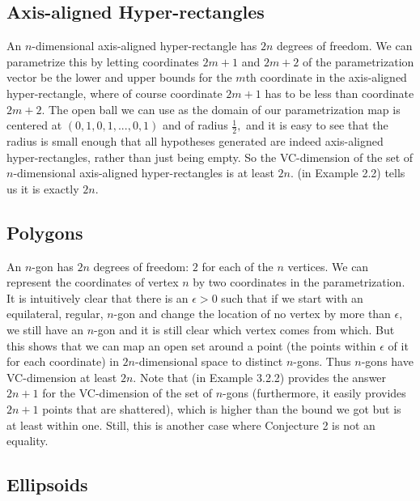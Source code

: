 \documentclass[12pt]{amsart}
\newcommand{\0}{\mat{0}}
\newcommand{\1}{\mathds{1}}
\begin{document}
\subsection{Axis-aligned Hyper-rectangles}

An $n$-dimensional axis-aligned hyper-rectangle has $2n$ degrees of freedom. We can parametrize this by letting coordinates $2m + 1$ and $2m + 2$ of the parametrization vector be the lower and upper bounds for the $m$th coordinate in the axis-aligned hyper-rectangle, where of course coordinate $2m + 1$ has to be less than coordinate $2m + 2.$ The open ball we can use as the domain of our parametrization map is centered at $(0, 1, 0, 1, ..., 0, 1)$ and of radius $\frac{1}{2},$ and it is easy to see that the radius is small enough that all hypotheses generated are indeed axis-aligned hyper-rectangles, rather than just being empty. So the VC-dimension of the set of $n$-dimensional axis-aligned hyper-rectangles is at least $2n.$ \citep{rectangles-ngons} (in Example 2.2) tells us it is exactly $2n.$

\subsection{Polygons}

An $n$-gon has $2n$ degrees of freedom: $2$ for each of the $n$ vertices. We can represent the coordinates of vertex $n$ by two coordinates in the parametrization. It is intuitively clear that there is an $\epsilon > 0$ such that if we start with an equilateral, regular, $n$-gon and change the location of no vertex by more than $\epsilon,$ we still have an $n$-gon and it is still clear which vertex comes from which. But this shows that we can map an open set around a point (the points within $\epsilon$ of it for each coordinate) in $2n$-dimensional space to distinct $n$-gons. Thus $n$-gons have VC-dimension at least $2n.$ Note that \citep{rectangles-ngons} (in Example 3.2.2) provides the answer $2n + 1$ for the VC-dimension of the set of $n$-gons (furthermore, it easily provides $2n + 1$ points that are shattered), which is higher than the bound we got but is at least within one. Still, this is another case where Conjecture 2 is not an equality.

\subsection{Ellipsoids}
\end{document}
